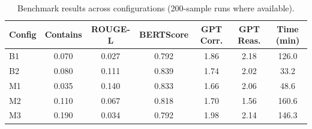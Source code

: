 \begin{table}[h]
\centering
\caption{Benchmark results across configurations (200-sample runs where available).}
\begin{tabular}{lcccccc}
\toprule
Config & Contains & ROUGE-L & BERTScore & GPT Corr. & GPT Reas. & Time (min) \\
\midrule
B1 & 0.070 & 0.027 & 0.792 & 1.86 & 2.18 & 126.0 \\
B2 & 0.080 & 0.111 & 0.839 & 1.74 & 2.02 & 33.2 \\
M1 & 0.035 & 0.140 & 0.833 & 1.66 & 2.06 & 48.6 \\
M2 & 0.110 & 0.067 & 0.818 & 1.70 & 1.56 & 160.6 \\
M3 & 0.190 & 0.034 & 0.792 & 1.98 & 2.14 & 146.3 \\
\bottomrule
\end{tabular}
\label{tab:benchmarks}
\end{table}
